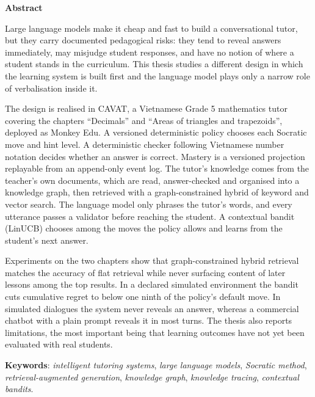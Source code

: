 \begin{center}
\textbf{\large{Abstract}	}
\end{center}


\begin{small}
Large language models make it cheap and fast to build a conversational tutor, but they carry documented pedagogical risks: they tend to reveal answers immediately, may misjudge student responses, and have no notion of where a student stands in the curriculum. This thesis studies a different design in which the learning system is built first and the language model plays only a narrow role of verbalisation inside it.

The design is realised in CAVAT, a Vietnamese Grade 5 mathematics tutor covering the chapters ``Decimals'' and ``Areas of triangles and trapezoids'', deployed as Monkey Edu. A versioned deterministic policy chooses each Socratic move and hint level. A deterministic checker following Vietnamese number notation decides whether an answer is correct. Mastery is a versioned projection replayable from an append-only event log. The tutor's knowledge comes from the teacher's own documents, which are read, answer-checked and organised into a knowledge graph, then retrieved with a graph-constrained hybrid of keyword and vector search. The language model only phrases the tutor's words, and every utterance passes a validator before reaching the student. A contextual bandit (LinUCB) chooses among the moves the policy allows and learns from the student's next answer.

Experiments on the two chapters show that graph-constrained hybrid retrieval matches the accuracy of flat retrieval while never surfacing content of later lessons among the top results. In a declared simulated environment the bandit cuts cumulative regret to below one ninth of the policy's default move. In simulated dialogues the system never reveals an answer, whereas a commercial chatbot with a plain prompt reveals it in most turns. The thesis also reports limitations, the most important being that learning outcomes have not yet been evaluated with real students.

\vspace*{1cm}
\textbf{Keywords}: \textit{intelligent tutoring systems}, \textit{large language models}, \textit{Socratic method}, \textit{retrieval-augmented generation}, \textit{knowledge graph}, \textit{knowledge tracing}, \textit{contextual bandits}.

\end{small}
